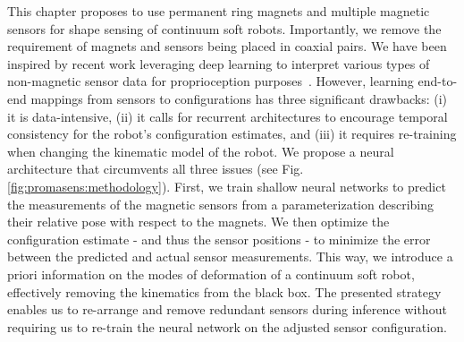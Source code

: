 This chapter proposes to use permanent ring magnets and multiple magnetic sensors for shape sensing of continuum soft robots. Importantly, we remove the requirement of magnets and sensors being placed in coaxial pairs.
%
We have been inspired by recent work leveraging deep learning to interpret various types of non-magnetic sensor data for proprioception purposes~\citep{truby2020distributed, ding2021predictive, soter2018bodily, thuruthel2019soft}.
%
However, learning end-to-end mappings from sensors to configurations has three significant drawbacks: (i) it is data-intensive, (ii) it calls for recurrent architectures to encourage temporal consistency for the robot's configuration estimates, and (iii) it requires re-training when changing the kinematic model of the robot. We propose a neural architecture that circumvents all three issues (see Fig. \ref{fig:promasens:methodology}).
First, we train shallow neural networks to predict the measurements of the magnetic sensors from a parameterization describing their relative pose with respect to the magnets. We then optimize the configuration estimate - and thus the sensor positions - to minimize the error between the predicted and actual sensor measurements. 
This way, we introduce a priori information on the modes of deformation of a continuum soft robot, effectively removing the kinematics from the black box. 
The presented strategy enables us to re-arrange and remove redundant sensors during inference without requiring us to re-train the neural network on the adjusted sensor configuration.

